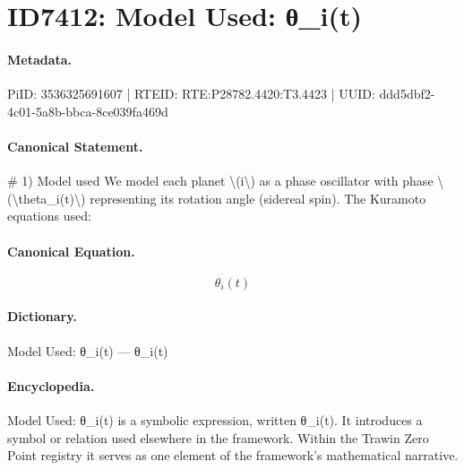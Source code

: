 \section*{ID7412: Model Used: θ\_i(t)}
\paragraph{Metadata.}
PiID: 3536325691607 | RTEID: RTE:P28782.4420:T3.4423 | UUID: ddd5dbf2-4c01-5a8b-bbca-8ce039fa469d

\paragraph{Canonical Statement.}
\# 1) Model used We model each planet \textbackslash{}(i\textbackslash{}) as a phase oscillator with phase \textbackslash{}(\textbackslash{}theta\_i(t)\textbackslash{}) representing its rotation angle (sidereal spin). The Kuramoto equations used:

\paragraph{Canonical Equation.}
\[
\theta_i(t)
\]

\paragraph{Dictionary.}
Model Used: θ\_i(t) — θ\_i(t)

\paragraph{Encyclopedia.}
Model Used: θ\_i(t) is a symbolic expression, written θ\_i(t). It introduces a symbol or relation used elsewhere in the framework. Within the Trawin Zero Point registry it serves as one element of the framework's mathematical narrative.
